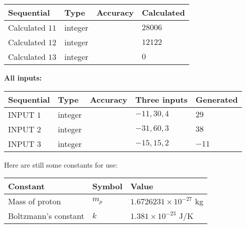 \documentclass[12pt]{article}
\begin{document}
   
  
  
\noindent\begin{tabular}{|l|l|l|l|}
\hline
 Sequential & Type & Accuracy & Calculated \\ 
\hline
 
 
  Calculated $           11 $ & integer &  & 
  $ 28006 $ 
 \\  \hline  
 
 
  Calculated $           12 $ & integer &  & 
  $ 12122 $ 
 \\  \hline  
 
 
  Calculated $           13 $ & integer &  & 
  $ 0 $ 
 \\  \hline  
 \end{tabular}
   
   
   
   
\noindent\vspace{0.1in}\hspace{-0.08in} {\textbf{\Large{All inputs: }}}
   
   
  
  
\noindent\begin{tabular}{|l|l|l|l|l|}
\hline
 Sequential & Type & Accuracy & Three inputs & Generated \\ 
\hline
 
 
  INPUT $            1 $ & integer &  & $
 -11
 , 
 30
 , 
 4
 $ & $ 29 $ 
 \\  \hline  
 
 
  INPUT $            2 $ & integer &  & $
 -31
 , 
 60
 , 
 3
 $ & $ 38 $ 
 \\  \hline  
 
 
  INPUT $            3 $ & integer &  & $
 -15
 , 
 15
 , 
 2
 $ & $ -11 $ 
 \\  \hline  
 \end{tabular}
   
   
   
   
   
   
 \vspace{0.2in}
Here are still some constants for use:
 
 
\noindent\begin{tabular}{|l|l|l|}
\hline
Constant & Symbol & Value \\
\hline
 
Mass of proton &
$m_p$ &
 $ 1.6726231 \times 10^{-27} $
kg \\
\hline
 
Boltzmann's constant &
$k$ &
 $ 1.381 \times 10^{-23} $
J/K \\
\hline
 
\end{tabular}
 
\end{document}
